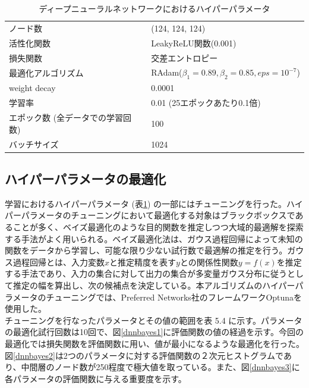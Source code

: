 \begin{table}[H]
 \centering
  \begin{tabular}{ l  l }
   \hline
   ノード数 & (124, 124, 124)\\
   活性化関数 & LeakyReLU関数(0.001)\\
   損失関数 & 交差エントロピー\\
   最適化アルゴリズム & RAdam($\beta_1 = 0.89, \beta_2 = 0.85, eps = 10^{-7}$)\\
   weight decay & 0.0001\\
   学習率 & 0.01 (25エポックあたり0.1倍)\\
   エポック数 (全データでの学習回数) & 100\\
   バッチサイズ & 1024\\
   \hline
  \end{tabular}
  \caption{ディープニューラルネットワークにおけるハイパーパラメータ}
  \label{dnnsetting}
\end{table}
\subsection{ハイパーパラメータの最適化}
学習におけるハイパーパラメータ (表\ref{dnnsetting}) の一部にはチューニングを行った。ハイパーパラメータのチューニングにおいて最適化する対象はブラックボックスであることが多く、ベイズ最適化\cite{bayesian}のような目的関数を推定しつつ大域的最適解を探索する手法がよく用いられる。ベイズ最適化法は、ガウス過程回帰によって未知の関数をデータから学習し、可能な限り少ない試行数で最適解の推定を行う。ガウス過程回帰とは、入力変数$x$と推定精度を表す$y$との関係性関数$y = f(x)$を推定する手法であり、入力の集合に対して出力の集合が多変量ガウス分布に従うとして推定の幅を算出し、次の候補点を決定している。本アルゴリズムのハイパーパラメータのチューニングでは、Preferred Networks社のフレームワークOptuna\cite{optuna}を使用した。\\
チューニングを行なったパラメータとその値の範囲を表 5.4%
に示す。パラメータの最適化試行回数は10回で、図\ref{dnnbayes1}に評価関数の値の経過を示す。今回の最適化では損失関数を評価関数に用い、値が最小になるような最適化を行った。図\ref{dnnbayes2}は2つのパラメータに対する評価関数の２次元ヒストグラムであり、中間層のノード数が250程度で極大値を取っている。また、図\ref{dnnbayes3}に各パラメータの評価関数に与える重要度を示す。

